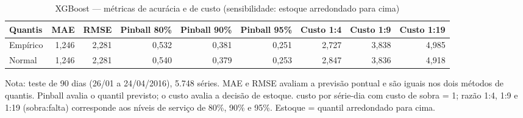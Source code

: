 \begin{table}[htbp]
\centering
\small
\caption{XGBoost — métricas de acurácia e de custo (sensibilidade: estoque arredondado para cima)}
\label{tab:xgb_metricas_sensibilidade}
\begin{tabular}{lrrrrrrrr}
\toprule
Quantis & MAE & RMSE & Pinball 80\% & Pinball 90\% & Pinball 95\% & Custo 1:4 & Custo 1:9 & Custo 1:19 \\
\midrule
Empírico & 1,246 & 2,281 & 0,532 & 0,381 & 0,251 & 2,727 & 3,838 & 4,985 \\
Normal & 1,246 & 2,281 & 0,540 & 0,379 & 0,253 & 2,847 & 3,836 & 4,918 \\
\bottomrule
\end{tabular}
\par\smallskip
{\footnotesize Nota: teste de 90 dias (26/01 a 24/04/2016), 5.748 séries. MAE e RMSE avaliam a previsão pontual e são iguais nos dois métodos de quantis. Pinball avalia o quantil previsto; o custo avalia a decisão de estoque. custo por série-dia com custo de sobra = 1; razão 1:4, 1:9 e 1:19 (sobra:falta) corresponde aos níveis de serviço de 80\%, 90\% e 95\%. Estoque = quantil arredondado para cima.}
\end{table}
